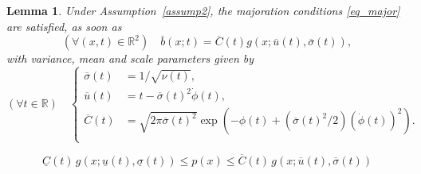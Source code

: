 \documentclass[10pt,a4paper]{amsart}
\newtheorem{lemma}{Lemma}
\newcommand{\bR}{\mathbb{R}}
\begin{document}
\begin{lemma}
\label{lem:ass2}
Under Assumption~\ref{assump2}, the majoration conditions \eqref{eq_major} are satisfied, as soon as
\begin{equation}
(\forall (x,t) \in \bR^2) \quad
\overline{b}(x;t)    = \overline{C}(t) g(x; \overline{u}(t), \overline{\sigma}(t)),
\end{equation}
with variance, mean and scale parameters given by
\begin{equation}
\label{eq:uppermean_variance_constant_gauss}
(\forall t \in \bR) \quad
\begin{cases}
\overline{\sigma}(t) & = 1/\sqrt{\nu(t)},\\
\overline{u}(t) & = t -\overline{\sigma}(t)^2 \dot{\phi}(t), \\
\overline{C}(t) & = \sqrt{2 \pi \overline{\sigma}(t)^2} \exp\left(- \phi(t) + (\overline{\sigma}(t)^2/2) (\dot{\phi}(t))^2\right). \\
\end{cases}
\end{equation}
\end{lemma}

\begin{equation}
\label{bounds_over_p}
\underline{C}(t)\, g(x;\underline{u}(t),\underline{\sigma}(t)) \leq p(x) 
\leq \overline{C}(t)\, g(x;\overline{u}(t),\overline{\sigma}(t))
\end{equation}
\end{document}
